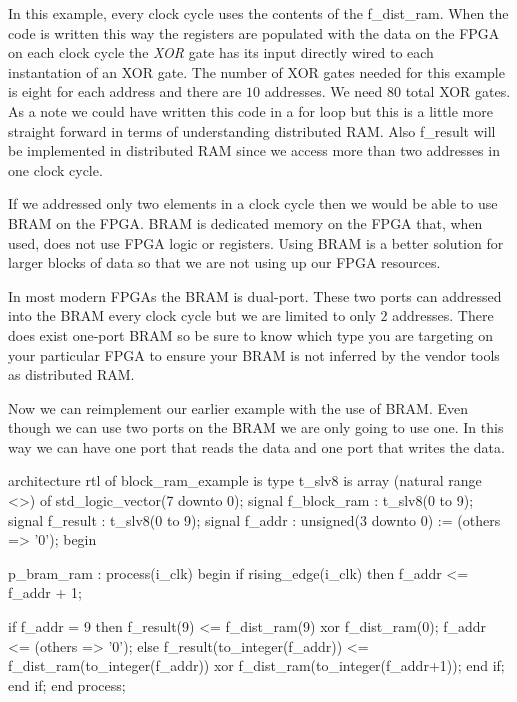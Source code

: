 In this example, every clock cycle uses the contents of the f\_dist\_ram. When the code is written this way the registers are populated with the data on the \ac{FPGA} on each clock cycle the \emph{XOR} gate has its input directly wired to each instantation of an \ac{XOR} gate. The number of \ac{XOR} gates needed for this example is eight for each address and there are $10$ addresses. We need $80$ total \ac{XOR} gates. As a note we could have written this code in a for loop but this is a little more straight forward in terms of understanding distributed \ac{RAM}. Also f\_result will be implemented in distributed \ac{RAM} since we access more than two addresses in one clock cycle. 

If we addressed only two elements in a clock cycle then we would be able to use \ac{BRAM} on the \ac{FPGA}. \ac{BRAM} is dedicated memory on the \ac{FPGA} that, when used, does not use \ac{FPGA} logic or registers. Using \ac{BRAM} is a better solution for larger blocks of data so that we are not using up our \ac{FPGA} resources. 

In most modern \ac{FPGA}s the \ac{BRAM} is dual-port. These two ports can addressed into the \ac{BRAM} every clock cycle but we are limited to only $2$ addresses. There does exist one-port \ac{BRAM} so be sure to know which type you are targeting on your particular \ac{FPGA} to ensure your \ac{BRAM} is not inferred by the vendor tools as distributed \ac{RAM}.

Now we can reimplement our earlier example with the use of \ac{BRAM}. Even though we can use two ports on the \ac{BRAM} we are only going to use one. In this way we can have one port that reads the data and one port that writes the data. 

\begin{VHDLlisting}[tabsize=8]
architecture rtl of block_ram_example is
	type t_slv8 is array (natural range <>) of std_logic_vector(7 downto 0);
	signal f_block_ram : t_slv8(0 to 9);
	signal f_result    : t_slv8(0 to 9);
	signal f_addr      : unsigned(3 downto 0) := (others => '0');
begin

p_bram_ram : process(i_clk)
begin
	if rising_edge(i_clk) then
		f_addr <= f_addr + 1;
		
		if f_addr = 9 then
			f_result(9) <= f_dist_ram(9) xor f_dist_ram(0);
			f_addr <= (others => '0');
		else
			f_result(to_integer(f_addr)) <= f_dist_ram(to_integer(f_addr)) xor 
										    f_dist_ram(to_integer(f_addr+1));
		end if;
	end if;
end process;
\end{VHDLlisting}

